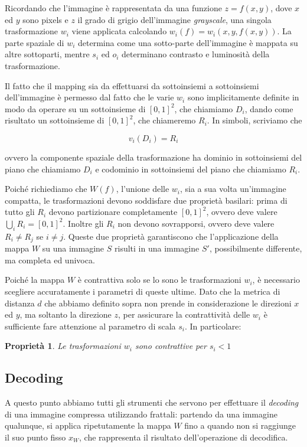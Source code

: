 \documentclass[11pt,a4paper,appendixprefix=true,numbers=noenddot]{scrreprt}
\newtheorem{proprieta}[teorema]{Proprietà}
\begin{document}
Ricordando che l'immagine è rappresentata da una funzione $z = f(x,y)$, dove $x$ ed $y$ sono pixels e $z$ il grado di grigio dell'immagine \emph{grayscale}, una singola trasformazione $w_i$ viene applicata calcolando $w_i(f) = w_i(x, y, f(x,y))$. La parte spaziale di $w_i$ determina come una sotto-parte dell'immagine è mappata su altre sottoparti, mentre $s_i$ ed $o_i$ determinano contrasto e luminosità della trasformazione.

Il fatto che il mapping sia da effettuarsi da sottoinsiemi a sottoinsiemi dell'immagine è permesso dal fatto che le varie $w_i$ sono implicitamente definite in modo da operare su un sottoinsieme di $[0,1]^2$, che chiamiamo $D_i$, dando come risultato un sottoinsieme di $[0,1]^2$, che chiameremo $R_i$. In simboli, scriviamo che

\[
v_i(D_i) = R_i
\]

ovvero la componente spaziale della trasformazione ha dominio in sottoinsiemi del piano che chiamiamo $D_i$ e codominio in sottoinsiemi del piano che chiamiamo $R_i$.

Poiché richiediamo che $W(f)$, l'unione delle $w_i$, sia a sua volta un'immagine compatta, le trasformazioni devono soddisfare due proprietà basilari: prima di tutto gli $R_i$ devono partizionare completamente $[0,1]^2$, ovvero deve valere $\bigcup_i R_i = [0,1]^2$. Inoltre gli $R_i$ non devono sovrapporsi, ovvero deve valere $R_i \not= R_j$ se $i \not= j$. Queste due proprietà garantiscono che l'applicazione della mappa $W$ su una immagine $S$ risulti in una immagine $S'$, possibilmente differente, ma completa ed univoca.

Poiché la mappa $W$ è contrattiva solo se lo sono le trasformazioni $w_i$, è necessario scegliere accuratamente i parametri di queste ultime. Dato che la metrica di distanza $d$ che abbiamo definito sopra non prende in considerazione le direzioni $x$ ed $y$, ma soltanto la direzione $z$, per assicurare la contrattività delle $w_i$ è sufficiente fare attenzione al parametro di scala $s_i$. In particolare:

\begin{proprieta}
Le trasformazioni $w_i$ sono contrattive per $s_i < 1$
\end{proprieta}

\subsection*{Decoding}

A questo punto abbiamo tutti gli strumenti che servono per effettuare il \emph{decoding} di una immagine compressa utilizzando frattali: partendo  da una immagine qualunque, si applica ripetutamente la mappa $W$ fino a quando non si raggiunge il suo punto fisso $x_W$, che rappresenta il risultato dell'operazione di decodifica.
\end{document}
